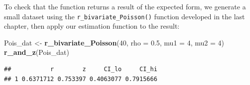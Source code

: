 \documentclass[
]{book}
\newenvironment{Shaded}{\begin{snugshade}}{\end{snugshade}}
\newcommand{\AttributeTok}[1]{\textcolor[rgb]{0.13,0.29,0.53}{#1}}
\newcommand{\ControlFlowTok}[1]{\textcolor[rgb]{0.13,0.29,0.53}{\textbf{#1}}}
\newcommand{\DecValTok}[1]{\textcolor[rgb]{0.00,0.00,0.81}{#1}}
\newcommand{\FloatTok}[1]{\textcolor[rgb]{0.00,0.00,0.81}{#1}}
\newcommand{\FunctionTok}[1]{\textcolor[rgb]{0.13,0.29,0.53}{\textbf{#1}}}
\newcommand{\NormalTok}[1]{#1}
\newcommand{\OtherTok}[1]{\textcolor[rgb]{0.56,0.35,0.01}{#1}}
\newcommand{\SpecialCharTok}[1]{\textcolor[rgb]{0.81,0.36,0.00}{\textbf{#1}}}
\begin{document}
\begin{Shaded}
\end{Shaded}

To check that the function returns a result of the expected form, we generate a small dataset using the \texttt{r\_bivariate\_Poisson()} function developed in the last chapter, then apply our estimation function to the result:

\begin{Shaded}
\begin{Highlighting}[]
\NormalTok{Pois\_dat }\OtherTok{\textless{}{-}} \FunctionTok{r\_bivariate\_Poisson}\NormalTok{(}\DecValTok{40}\NormalTok{, }\AttributeTok{rho =} \FloatTok{0.5}\NormalTok{, }\AttributeTok{mu1 =} \DecValTok{4}\NormalTok{, }\AttributeTok{mu2 =} \DecValTok{4}\NormalTok{)}
\FunctionTok{r\_and\_z}\NormalTok{(Pois\_dat)}
\end{Highlighting}
\end{Shaded}

\begin{verbatim}
##           r        z     CI_lo     CI_hi
## 1 0.6371712 0.753397 0.4063077 0.7915666
\end{verbatim}
\end{document}

